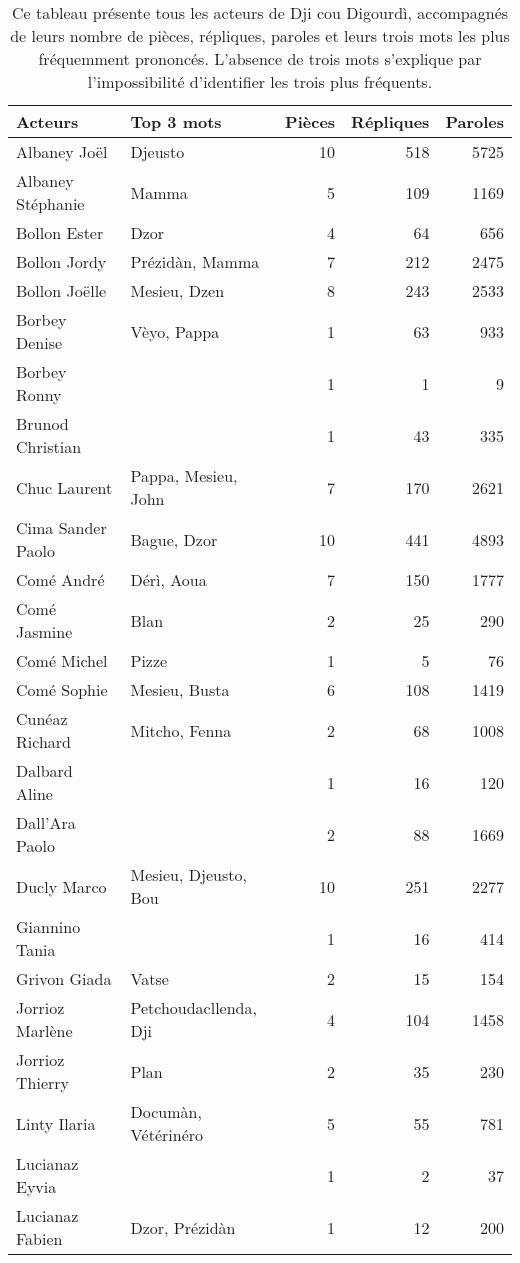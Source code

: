 \begin{longtable}{llrrr}
\caption{\small Ce tableau présente tous les acteurs de Dji cou Digourdì, accompagnés de leurs nombre de pièces, répliques, paroles et leurs trois mots les plus fréquemment prononcés. L'absence de trois mots s'explique par l'impossibilité d'identifier les trois plus fréquents.}\\
\toprule
\textbf{Acteurs} & \textbf{Top 3 mots} & \textbf{Pièces} & \textbf{Répliques} & \textbf{Paroles} \\
    \midrule
Albaney Joël &Djeusto & 10 & 518 & 5725\\
Albaney Stéphanie &Mamma & 5 & 109 & 1169\\
Bollon Ester &Dzor & 4 & 64 & 656\\
Bollon Jordy &Prézidàn, Mamma & 7 & 212 & 2475\\
Bollon Joëlle &Mesieu, Dzen & 8 & 243 & 2533\\
Borbey Denise &Vèyo, Pappa & 1 & 63 & 933\\
Borbey Ronny & & 1 & 1 & 9\\
Brunod Christian & & 1 & 43 & 335\\
Chuc Laurent &Pappa, Mesieu, John & 7 & 170 & 2621\\
Cima Sander Paolo &Bague, Dzor & 10 & 441 & 4893\\
Comé André &Dérì, Aoua & 7 & 150 & 1777\\
Comé Jasmine &Blan & 2 & 25 & 290\\
Comé Michel &Pizze & 1 & 5 & 76\\
Comé Sophie &Mesieu, Busta & 6 & 108 & 1419\\
Cunéaz Richard &Mitcho, Fenna & 2 & 68 & 1008\\
Dalbard Aline & & 1 & 16 & 120\\
Dall'Ara Paolo & & 2 & 88 & 1669\\
Ducly Marco &Mesieu, Djeusto, Bou & 10 & 251 & 2277\\
Giannino Tania & & 1 & 16 & 414\\
Grivon Giada &Vatse & 2 & 15 & 154\\
Jorrioz Marlène &Petchoudacllenda, Dji & 4 & 104 & 1458\\
Jorrioz Thierry &Plan & 2 & 35 & 230\\
Linty Ilaria &Documàn, Vétérinéro & 5 & 55 & 781\\
Lucianaz Eyvia & & 1 & 2 & 37\\
Lucianaz Fabien &Dzor, Prézidàn & 1 & 12 & 200\\

\end{longtable}
